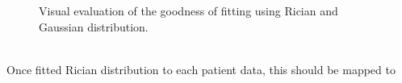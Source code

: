 \begin{figure}
  \centering
  \hfill
  \hfill
  \caption{Visual evaluation of the goodness of fitting using Rician and Gaussian distribution.}
  \label{fig:fitting}
\end{figure}

\\
Once fitted Rician distribution to each patient data, this should be mapped to 


